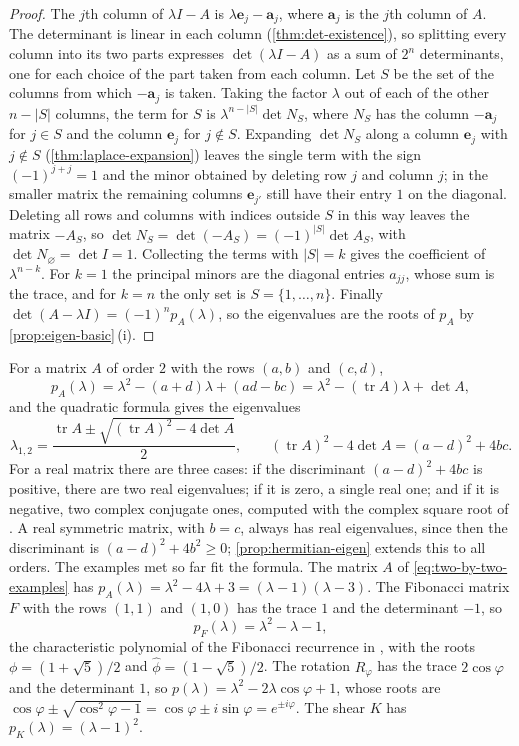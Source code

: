 \begin{proof}
The $j$th column of $\lambda I-A$ is $\lambda\mathbf e_j-\mathbf a_j$, where $\mathbf a_j$ is the $j$th column of $A$. The determinant is linear in each column (\cref{thm:det-existence}), so splitting every column into its two parts expresses $\det(\lambda I-A)$ as a sum of $2^n$ determinants, one for each choice of the part taken from each column. Let $S$ be the set of the columns from which $-\mathbf a_j$ is taken. Taking the factor $\lambda$ out of each of the other $n-|S|$ columns, the term for $S$ is $\lambda^{n-|S|}\det N_S$, where $N_S$ has the column $-\mathbf a_j$ for $j\in S$ and the column $\mathbf e_j$ for $j\notin S$. Expanding $\det N_S$ along a column $\mathbf e_j$ with $j\notin S$ (\cref{thm:laplace-expansion}) leaves the single term with the sign $(-1)^{j+j}=1$ and the minor obtained by deleting row $j$ and column $j$; in the smaller matrix the remaining columns $\mathbf e_{j'}$ still have their entry $1$ on the diagonal. Deleting all rows and columns with indices outside $S$ in this way leaves the matrix $-A_S$, so $\det N_S=\det(-A_S)=(-1)^{|S|}\det A_S$, with $\det N_\varnothing=\det I=1$. Collecting the terms with $|S|=k$ gives the coefficient of $\lambda^{n-k}$. For $k=1$ the principal minors are the diagonal entries $a_{jj}$, whose sum is the trace, and for $k=n$ the only set is $S=\{1,\ldots,n\}$. Finally $\det(A-\lambda I)=(-1)^np_A(\lambda)$, so the eigenvalues are the roots of $p_A$ by \cref{prop:eigen-basic}\,(i).
\end{proof}

For a matrix $A$ of order $2$ with the rows $(a,b)$ and $(c,d)$,
\[
p_A(\lambda)=\lambda^2-(a+d)\lambda+(ad-bc)=\lambda^2-(\operatorname{tr}A)\lambda+\det A ,
\]
and the quadratic formula gives the eigenvalues
\begin{equation}
\lambda_{1,2}=\frac{\operatorname{tr}A\pm\sqrt{(\operatorname{tr}A)^2-4\det A}}{2},\qquad(\operatorname{tr}A)^2-4\det A=(a-d)^2+4bc .
\label{eq:eigen-2x2}
\end{equation}
For a real matrix there are three cases: if the discriminant $(a-d)^2+4bc$ is positive, there are two real eigenvalues; if it is zero, a single real one; and if it is negative, two complex conjugate ones, computed with the complex square root of . A real symmetric matrix, with $b=c$, always has real eigenvalues, since then the discriminant is $(a-d)^2+4b^2\ge0$; \cref{prop:hermitian-eigen} extends this to all orders. The examples met so far fit the formula. The matrix $A$ of \eqref{eq:two-by-two-examples} has $p_A(\lambda)=\lambda^2-4\lambda+3=(\lambda-1)(\lambda-3)$. The Fibonacci matrix $F$ with the rows $(1,1)$ and $(1,0)$ has the trace $1$ and the determinant $-1$, so
\[
p_F(\lambda)=\lambda^2-\lambda-1,
\]
the characteristic polynomial of the Fibonacci recurrence in , with the roots $\phi=(1+\sqrt5)/2$ and $\hat\phi=(1-\sqrt5)/2$. The rotation $R_\varphi$ has the trace $2\cos\varphi$ and the determinant $1$, so $p(\lambda)=\lambda^2-2\lambda\cos\varphi+1$, whose roots are $\cos\varphi\pm\sqrt{\cos^2\varphi-1}=\cos\varphi\pm i\sin\varphi=e^{\pm i\varphi}$. The shear $K$ has $p_K(\lambda)=(\lambda-1)^2$.


